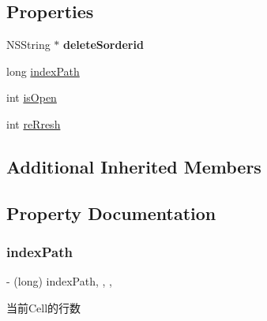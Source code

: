\subsection*{Properties}
\begin{DoxyCompactItemize}
\item 
\mbox{\label{interface_near_by_share_order_view_controller_ad7d951e73436097752d2daf816a47fba}} 
N\+S\+String $\ast$ {\bfseries delete\+Sorderid}
\item 
long \mbox{\hyperlink{interface_near_by_share_order_view_controller_a425f2c7f6e3f74554965989e3fce5137}{index\+Path}}
\item 
int \mbox{\hyperlink{interface_near_by_share_order_view_controller_ae31e9c69a3360f3f5a6371b927f48567}{is\+Open}}
\item 
int \mbox{\hyperlink{interface_near_by_share_order_view_controller_aa3d93d60a04fdfc3d415df7f0fa381b6}{re\+Rresh}}
\end{DoxyCompactItemize}
\subsection*{Additional Inherited Members}


\subsection{Property Documentation}
\mbox{\label{interface_near_by_share_order_view_controller_a425f2c7f6e3f74554965989e3fce5137}} 
\subsubsection{\texorpdfstring{index\+Path}{indexPath}}
{\footnotesize\ttfamily -\/ (long) index\+Path\hspace{0.3cm}{\ttfamily [read]}, {\ttfamily [write]}, {\ttfamily [nonatomic]}, {\ttfamily [assign]}}

当前\+Cell的行数 \mbox{\label{interface_near_by_share_order_view_controller_ae31e9c69a3360f3f5a6371b927f48567}} 
